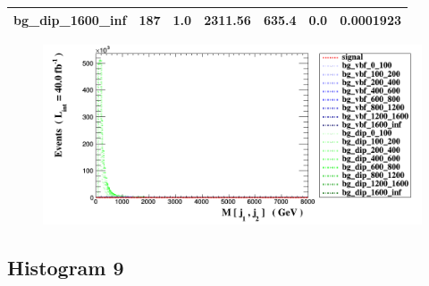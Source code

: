 \documentclass[a4paper, 10pt]{article}
\begin{document}
\begin{table}[H]
\begin{center}
\begin{tabular}{|m{23.0mm}|m{23.0mm}|m{18.0mm}|m{19.0mm}|m{19.0mm}|m{19.0mm}|m{19.0mm}|}
      \hline
      {\cellcolor{white}         bg\_dip\_1600\_inf}& {\cellcolor{white}         187}& {\cellcolor{white}         1.0}& {\cellcolor{white}         2311.56}& {\cellcolor{white}         635.4}& {\cellcolor{green}         0.0}& {\cellcolor{green}         0.0001923}\\
\hline
    \end{tabular}
  \end{center}
\end{table}

\begin{figure}[H]
  \begin{center}
    \includegraphics[scale=0.45]{selection_7.png}\\
\caption{   }
  \end{center}
\end{figure}
      \newpage
\subsection{ Histogram 9}
\end{document}
